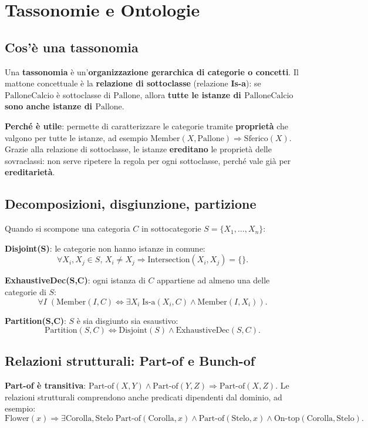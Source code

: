 \documentclass[11pt,a4paper]{report}
\begin{document}
\section{Tassonomie e Ontologie}

\subsection{Cos'è una tassonomia}

Una \textbf{tassonomia} è un'\textbf{organizzazione gerarchica di categorie o concetti}. Il mattone concettuale è la \textbf{relazione di sottoclasse} (relazione \textbf{Is-a}): se $\text{PalloneCalcio}$ è sottoclasse di $\text{Pallone}$, allora \textbf{tutte le istanze di $\text{PalloneCalcio}$ sono anche istanze di $\text{Pallone}$}.

\textbf{Perché è utile}: permette di caratterizzare le categorie tramite \textbf{proprietà} che valgono per tutte le istanze, ad esempio $\text{Member}(X,\text{Pallone}) \Rightarrow \text{Sferico}(X)$. Grazie alla relazione di sottoclasse, le istanze \textbf{ereditano} le proprietà delle sovraclassi: non serve ripetere la regola per ogni sottoclasse, perché vale già per \textbf{ereditarietà}.

\subsection{Decomposizioni, disgiunzione, partizione}

Quando si scompone una categoria $C$ in sottocategorie $S=\{X_1,\dots,X_n\}$:

\textbf{Disjoint(S)}: le categorie non hanno istanze in comune:
\[
\forall X_i,X_j \in S,\, X_i \ne X_j \Rightarrow \text{Intersection}(X_i,X_j) = \{\}.
\]

\textbf{ExhaustiveDec(S,C)}: ogni istanza di $C$ appartiene ad almeno una delle categorie di $S$:
\[
\forall I\; (\text{Member}(I,C) \Leftrightarrow \exists X_i\; \text{Is-a}(X_i,C) \wedge \text{Member}(I,X_i)).
\]

\textbf{Partition(S,C)}: $S$ è sia disgiunto sia esaustivo:
\[
\text{Partition}(S,C) \Leftrightarrow \text{Disjoint}(S) \wedge \text{ExhaustiveDec}(S,C).
\]

\subsection{Relazioni strutturali: Part-of e Bunch-of}

\textbf{Part-of è transitiva}: $\text{Part-of}(X,Y) \wedge \text{Part-of}(Y,Z) \Rightarrow \text{Part-of}(X,Z)$. Le relazioni strutturali comprendono anche predicati dipendenti dal dominio, ad esempio:
\[
\text{Flower}(x) \Rightarrow \exists \text{Corolla},\text{Stelo}\; \text{Part-of}(\text{Corolla},x) \wedge \text{Part-of}(\text{Stelo},x) \wedge \text{On-top}(\text{Corolla},\text{Stelo}).
\]
\end{document}
